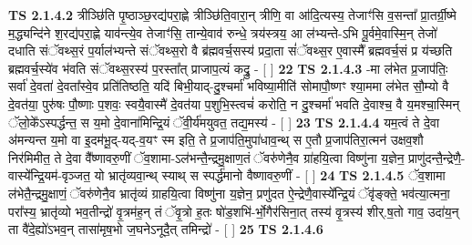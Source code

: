 \documentclass[17pt]{extarticle}
\begin{document}
                  \newline
                                \textbf{ TS 2.1.4.2} \newline
                  त्रीञ्छि॑ति पृ॒ष्ठाञ्छ॒रद्य॑परा॒ह्णे त्रीञ्छि॑ति॒वारा॒न् त्रीणि॒ वा आ॑दि॒त्यस्य॒ तेजाꣳ॑सि व॒सन्ता᳚ प्रा॒तर्ग्री॒ष्मे म॒द्ध्यन्दि॑ने श॒रद्य॑परा॒ह्णे याव॑न्त्ये॒व तेजाꣳ॑सि॒ तान्ये॒वाव॑ रुन्धे॒ त्रय॑स्त्रय॒ आ ल॑भ्यन्ते-ऽभि पू॒र्वमे॒वास्मि॒न् तेजो॑ दधाति संॅवथ्स॒रं प॒र्याल॑भ्यन्ते संॅवथ्स॒रो वै ब्र॑ह्मवर्च॒सस्य॑ प्रदा॒ता सं॑ॅवथ्स॒र ए॒वास्मै᳚ ब्रह्मवर्च॒सं प्र य॑च्छति ब्रह्मवर्च॒स्ये॑व भ॑वति संॅवथ्स॒रस्य॑ प॒रस्ता᳚त् प्राजाप॒त्यं कद्रु॒ - [  ] \textbf{  22} \newline
                  \newline
                                \textbf{ TS 2.1.4.3} \newline
                  -मा ल॑भेत प्र॒जाप॑तिः॒ सर्वा॑ दे॒वता॑ दे॒वता᳚स्वे॒व प्रति॑तिष्ठति॒ यदि॑ बिभी॒याद्-दु॒श्चर्मा॑ भविष्या॒मीति॑ सोमापौ॒ष्णꣳ श्या॒ममा ल॑भेत सौ॒म्यो वै दे॒वत॑या॒ पुरु॑षः पौ॒ष्णाः प॒शवः॒ स्वयै॒वास्मै॑ दे॒वत॑या प॒शुभि॒स्त्वचं॑ करोति॒ न दु॒श्चर्मा॑ भवति दे॒वाश्च॒ वै य॒मश्चा॒स्मिन् ॅलो॒के᳚ऽस्पर्द्धन्त॒ स य॒मो दे॒वाना॑मिन्द्रि॒यं ॅवी॒र्य॑मयुवत॒ तद्य॒मस्य॑ - [  ] \textbf{  23} \newline
                  \newline
                                \textbf{ TS 2.1.4.4} \newline
                  यम॒त्वं ते दे॒वा अ॑मन्यन्त य॒मो वा इ॒दम॑भू॒द्-यद्-व॒यꣳ स्म इति॒ ते प्र॒जाप॑ति॒मुपा॑धाव॒न्थ् स ए॒तौ प्र॒जाप॑तिरा॒त्मन॑ उक्षव॒शौ निर॑मिमीत॒ ते दे॒वा वै᳚ष्णावरु॒णीं ॅव॒शामा-ऽल॑भन्तै॒न्द्रमु॒क्षाण॒तं ॅवरु॑णेनै॒व ग्रा॑हयि॒त्वा विष्णु॑ना य॒ज्ञेन॒ प्राणु॑दन्तै॒न्द्रेणै॒-वास्ये᳚न्द्रि॒यम॑-वृञ्जत॒ यो भ्रातृ॑व्यवा॒न्थ् स्याथ् स स्पर्द्ध॑मानो वैष्णावरु॒णीं - [  ] \textbf{  24} \newline
                  \newline
                                \textbf{ TS 2.1.4.5} \newline
                  ॅव॒शामा ल॑भेतै॒न्द्रमु॒क्षाणं॒ ॅवरु॑णेनै॒व भ्रातृ॑व्यं ग्राहयि॒त्वा विष्णु॑ना य॒ज्ञेन॒ प्रणु॑दत ऐ॒न्द्रेणै॒वास्ये᳚न्द्रि॒यं ॅवृ॑ङ्क्ते॒ भव॑त्या॒त्मना॒ परा᳚स्य॒ भ्रातृ॑व्यो भव॒तीन्द्रो॑ वृ॒त्रम॑ह॒न् तं ॅवृ॒त्रो ह॒तः षो॑ड॒शभि॑-र्भो॒गैर॑सिना॒त् तस्य॑ वृ॒त्रस्य॑ शीर्.ष॒तो गाव॒ उदा॑य॒न् ता वै॑दे॒ह्यो॑ऽभव॒न् तासा॑मृष॒भो ज॒घनेऽनूदै॒त् तमिन्द्रो॑ - [  ] \textbf{  25} \newline
                  \newline
                                \textbf{ TS 2.1.4.6} \newline
\end{document}
